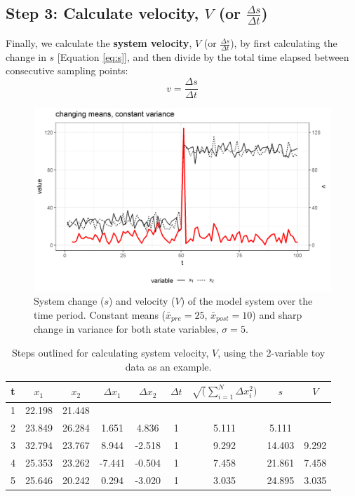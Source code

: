 \documentclass[print]{nuthesis}
\begin{document}
\hypertarget{step-3-calculate-velocity-v-or-fracdelta-sdelta-t}{%
\subsection{\texorpdfstring{Step 3: Calculate velocity, \(V\) (or \(\frac{\Delta s}{\Delta t}\))}{Step 3: Calculate velocity, V (or \textbackslash frac\{\textbackslash Delta s\}\{\textbackslash Delta t\})}}\label{step-3-calculate-velocity-v-or-fracdelta-sdelta-t}}

Finally, we calculate the \textbf{system velocity}, \(V\) (or \(\frac{\Delta s}{\Delta t}\)), by first calculating the change in \(s\) {[}Equation \eqref{eq:s}{]}, and then divide by the total time elapsed between consecutive sampling points:
\begin{equation}
 v = \frac {\Delta s}{\Delta t} 
\label{eq:velocity}
\end{equation}
\begin{figure}
\includegraphics[width=0.85\linewidth]{./chapterFiles/velocity/figsCalledInDiss/velocitySysEx1} \caption{System change ($s$) and velocity ($V$) of the model system over the time period. Constant means ($\bar{x}_{pre}=25$, $\bar{x}_{post}=10$) and sharp change in variance for both state variables, $\sigma =5$.}\label{fig:velocSysEx1}
\end{figure}
\begin{table}[t]

\caption{\label{tab:distTab}Steps outlined for calculating system velocity, $V$, using the 2-variable toy data as an example.}
\centering
\begin{tabular}{ccccccccc}
\toprule
t & $x_1$ & $x_2$ & $\Delta x_1$ & $\Delta x_2$ & $\Delta t$ & $\sqrt(\sum_{i=1}^N \Delta x_i^2) $ & $s$ & $V$\\
\midrule
1 & 22.198 & 21.448 &  &  &  &  &  & \\
2 & 23.849 & 26.284 & 1.651 & 4.836 & 1 & 5.111 & 5.111 & \\
3 & 32.794 & 23.767 & 8.944 & -2.518 & 1 & 9.292 & 14.403 & 9.292\\
4 & 25.353 & 23.262 & -7.441 & -0.504 & 1 & 7.458 & 21.861 & 7.458\\
5 & 25.646 & 20.242 & 0.294 & -3.020 & 1 & 3.035 & 24.895 & 3.035\\
\bottomrule
\end{tabular}
\end{table}
\end{document}

